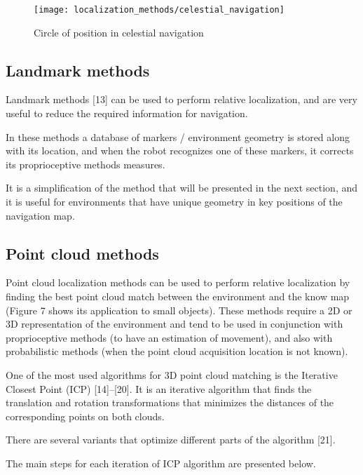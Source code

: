 \begin{figure}[h]
	\centering
	\texttt{[image: localization\_methods/celestial\_navigation]}
	\caption{Circle of position in celestial navigation}
	\label{fig:localization-methods_celestial-navigation}
\end{figure}


\subsection{Landmark methods}

Landmark methods [13] can be used to perform relative localization, and are very useful to reduce the required information for navigation.

In these methods a database of markers / environment geometry is stored along with its location, and when the robot recognizes one of these markers, it corrects its proprioceptive methods measures.

It is a simplification of the method that will be presented in the next section, and it is useful for environments that have unique geometry in key positions of the navigation map.


\subsection{Point cloud methods}

Point cloud localization methods can be used to perform relative localization by finding the best point cloud match between the environment and the know map (Figure 7 shows its application to small objects). These methods require a 2D or 3D representation of the environment and tend to be used in conjunction with proprioceptive methods (to have an estimation of movement), and also with probabilistic methods (when the point cloud acquisition location is not known).

One of the most used algorithms for 3D point cloud matching is the Iterative Closest Point (ICP) [14]--[20]. It is an iterative algorithm that finds the translation and rotation transformations that minimizes the distances of the corresponding points on both clouds.

There are several variants that optimize different parts of the algorithm [21].

The main steps for each iteration of ICP algorithm are presented below.

